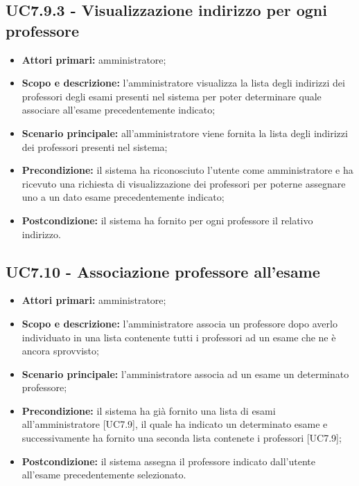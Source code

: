 \documentclass[AnalisiDeiRequisiti.tex]{subfiles}
\begin{document}
\subsection{UC7.9.3 - Visualizzazione indirizzo per ogni professore}
\begin{itemize}
	\item \textbf{Attori primari:} amministratore;
	\item \textbf{Scopo e descrizione:} l'amministratore visualizza la lista degli indirizzi dei professori degli esami presenti nel sistema per poter determinare quale associare all'esame precedentemente indicato;
	\item \textbf{Scenario principale:} all'amministratore viene fornita la lista degli indirizzi dei professori presenti nel sistema;
	\item \textbf{Precondizione:} il sistema ha riconosciuto l'utente come amministratore e ha ricevuto una richiesta di visualizzazione dei professori per poterne assegnare uno a un dato esame precedentemente indicato; 
	\item \textbf{Postcondizione:} il sistema ha fornito per ogni professore il relativo indirizzo.
\end{itemize}
\subsection{UC7.10 - Associazione professore all'esame}
\begin{itemize}
	\item \textbf{Attori primari:} amministratore;
	\item \textbf{Scopo e descrizione:} l'amministratore associa un professore dopo averlo individuato in una lista contenente tutti i professori ad un esame che ne è ancora sprovvisto;
	\item \textbf{Scenario principale:} l'amministratore associa ad un esame un determinato professore;
	\item \textbf{Precondizione:} il sistema ha già fornito una lista di esami all'amministratore [UC7.9], il quale ha indicato un determinato esame e successivamente ha fornito una seconda lista contenete i professori [UC7.9]; 
	\item \textbf{Postcondizione:} il sistema assegna il professore indicato dall'utente all'esame precedentemente selezionato.
\end{itemize}
\end{document}
